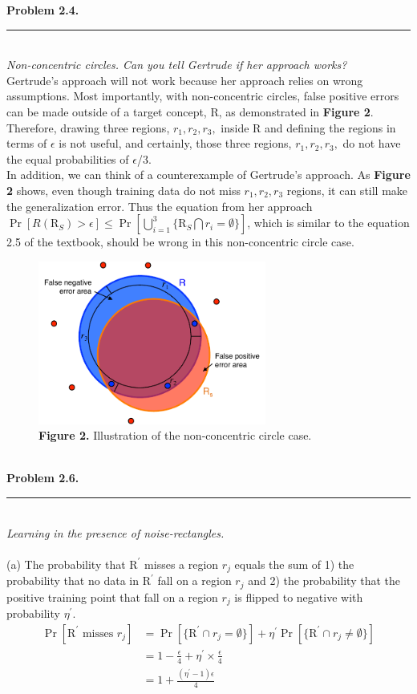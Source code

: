 \documentclass[letterpaper,11pt,notitlepage]{article}
\begin{document}
\hspace*{-1cm}\textbf{Problem 2.4.}  \rule{10.5cm}{0.4pt}\\
\noindent\textit{Non-concentric circles. Can you tell Gertrude if her approach works?}\\

\indent Gertrude's approach will not work because her approach relies on wrong assumptions. Most importantly, with non-concentric circles, false positive errors can be made outside of a target concept, R, as demonstrated in \textbf{Figure 2}. Therefore, drawing three regions, $r_1, r_2, r_3,$ inside R and defining the regions in terms of $\epsilon$ is not useful, and certainly, those three regions, $r_1, r_2, r_3,$ do not have the equal probabilities of $\epsilon$/3.\\
\indent In addition, we can think of a counterexample of Gertrude's approach. As \textbf{Figure 2} shows, even though training data do not miss $r_1, r_2, r_3$ regions, it can still make the generalization error. Thus the equation from her approach 
$\Pr[R(\text{R}_S)>\epsilon]\le \Pr[\bigcup^{3}_{i=1}\{\text{R}_S \bigcap r_i=\emptyset\}]$, which is similar to the equation 2.5 of the textbook, should be wrong in this non-concentric circle case. 

\begin{figure}[ht!]
	\centering
	\includegraphics[width=7.5cm]{Figure2}
	\captionsetup{width=.8\textwidth}
	\caption{\textbf{Figure 2.} Illustration of the non-concentric circle case.} 
\end{figure} \leavevmode \\

\hspace*{-1cm}\textbf{Problem 2.6.}  \rule{10.5cm}{0.4pt}\\
\noindent\textit{Learning in the presence of noise-rectangles.}\\\\

\noindent (a) The probability that $\text{R}^\prime$ misses a region $r_j$ equals the sum of 1) the probability that 
no data in $\text{R}^\prime$ fall on a region $r_j$ and 2) the probability that the positive training point that fall on a region $r_j$ is flipped to negative with probability $\eta^\prime$. 
\begin{align*}
\Pr[\text{R}^\prime \text{ misses }r_j] &= \Pr[\{\text{R}^\prime \cap r_j =\emptyset\}] + \eta^\prime\Pr[\{\text{R}^\prime \cap r_j \neq\emptyset\}]\\
&= 1-\frac{\epsilon}{4} + \eta^\prime\times\frac{\epsilon}{4}\\
&= 1+\frac{(\eta^\prime-1)\epsilon}{4}\\
\end{align*}
\end{document}
